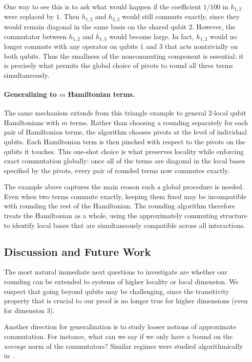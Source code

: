 \documentclass[a4paper,onecolumn,11pt]{quantumarticle}
\theoremstyle{plain}
\begin{document}
One way to see this is to ask what would happen if the coefficient
$1/100$ in $h_{1,2}$ were replaced by $1$.  Then $h_{1,2}$ and $h_{2,3}$
would still commute exactly, since they would remain diagonal in the same
basis on the shared qubit $2$.  However, the commutator between $h_{1,2}$
and $h_{1,3}$ would become large.  In fact, $h_{1,2}$ would no longer
commute with any operator on qubits $1$ and $3$ that acts nontrivially on
both qubits.  Thus the smallness of the noncommuting component is
essential: it is precisely what permits the global choice of pivots to
round all three terms simultaneously.

\paragraph{Generalizing to $m$ Hamiltonian terms.}

The same mechanism extends from this triangle example to general
$2$-local qubit Hamiltonians with $m$ terms.  Rather than choosing a
rounding separately for each pair of Hamiltonian terms, the algorithm
chooses pivots at the level of individual qubits.  Each Hamiltonian term
is then pinched with respect to the pivots on the qubits it touches.  This
one-shot choice is what preserves locality while enforcing exact
commutation globally: once all of the terms are diagonal in the local bases
specified by the pivots, every pair of rounded terms now commutes exactly.

The example above captures the main reason such a global procedure is
needed.  Even when two terms commute exactly, keeping them fixed may be
incompatible with rounding the rest of the Hamiltonian.  The rounding
algorithm therefore treats the Hamiltonian as a whole, using the
approximately commuting structure to identify local bases that are
simultaneously compatible across all interactions.

\subsection{Discussion and Future Work}
The most natural immediate next questions to investigate are whether our rounding can be extended to systems of higher locality or local dimension. We suspect that going beyond qubits may be challenging, since the transitivity property that is crucial to our proof is no longer true for higher dimensions (even for dimension 3). 

Another direction for generalization is to study looser notions of approximate commutation. For instance, what can we say if we only have a bound on the \emph{average} norm of the commutators? Similar regimes were studied algorithmically in~\cite{schmidhuber2025hamiltoniandecodedquantuminterferometry}. 
\end{document}

